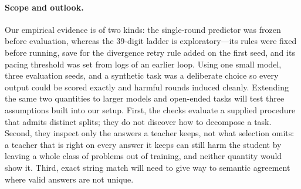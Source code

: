 \paragraph{Scope and outlook.}
\label{sec:limits}
Our empirical evidence is of two kinds: the single-round predictor was frozen
before evaluation, whereas the 39-digit ladder is exploratory---its rules were
fixed before running, save for the divergence retry rule added on the first
seed, and its pacing threshold was set from logs of an earlier loop. Using one
small model, three evaluation seeds, and a synthetic task was a deliberate
choice so every output could be scored exactly and harmful rounds induced
cleanly. Extending the same two quantities to larger models and open-ended
tasks will test three assumptions built into our setup. First, the checks
evaluate a supplied procedure that admits distinct splits; they do not discover
how to decompose a task. Second, they inspect only the answers a teacher keeps,
not what selection omits: a teacher that is right on every answer it keeps
can still harm the student by leaving a whole class of problems out of
training, and neither quantity would show it. Third, exact
string match will need to give way to semantic agreement where valid answers
are not unique.
